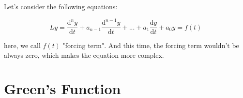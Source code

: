 \documentclass{article}
\begin{document}
Let's consider the following equations:

$$ Ly = \frac{\mathrm{d}^{n}y}{\mathrm{d}t} + a_{n-1} \frac{\mathrm{d}^{n-1}y}{\mathrm{d}t} + ... + a_{1} \frac{\mathrm{d}y}{\mathrm{d}t} + a_{0} y = f(t)$$

here, we call $f(t)$ "forcing term". And this time, the forcing term wouldn't be always zero, which makes the equation more complex.

\section{Green's Function}
\end{document}
